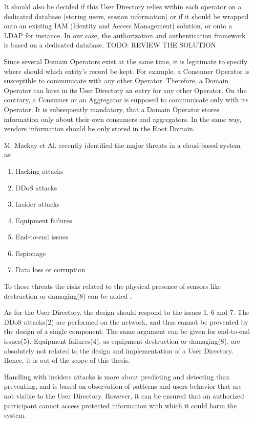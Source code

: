 It should also be decided if this User Directory relies within each operator on a dedicated database (storing users, session information) or if it should be wrapped onto an existing IAM (Identity and Access Management) solution, or onto a LDAP for instance. In our case, the authorization and authentication framework is based on a dedicated database.
{ \huge TODO: REVIEW THE SOLUTION }

Since several Domain Operators exist at the same time, it is legitimate to specify where should which entity's record be kept. For example, a Consumer Operator is susceptible to communicate with any other Operator. Therefore, a Domain Operator can have in its User Directory an entry for any other Operator. On the contrary, a Consumer or an Aggregator is supposed to communicate only with its Operator. It is subsequently mandatory, that a Domain Operator stores information only about their own consumers and aggregators. In the same way, vendors information should be only stored in the Root Domain.

M. Mackay et Al. recently identified the major threats in a cloud-based system as\cite{Mackay2012}: 
\begin{enumerate}
	\item Hacking attacks
	\item DDoS attacks
	\item Insider attacks
	\item Equipment failures
	\item End-to-end issues
	\item Espionage
	\item Data loss or corruption
\end{enumerate}

To those threats the risks related to the physical presence of sensors like destruction or damaging(8) can be added .

As for the User Directory, the design should respond to the issues 1, 6 and 7. The DDoS attacks(2) are performed on the network, and thus cannot be prevented by the design of a single component. The same argument can be given for end-to-end issues(5). Equipment failures(4), as equipment destruction or damaging(8), are absolutely not related to the design and implementation of a User Directory. Hence, it is out of the scope of this thesis. 

Handling with insiders attacks is more about predicting and detecting than preventing, and is based on observation of patterns and users behavior that are not visible to the User Directory\cite{Schultz2002}. However, it can be ensured that an authorized participant cannot access protected information with which it could harm the system.

